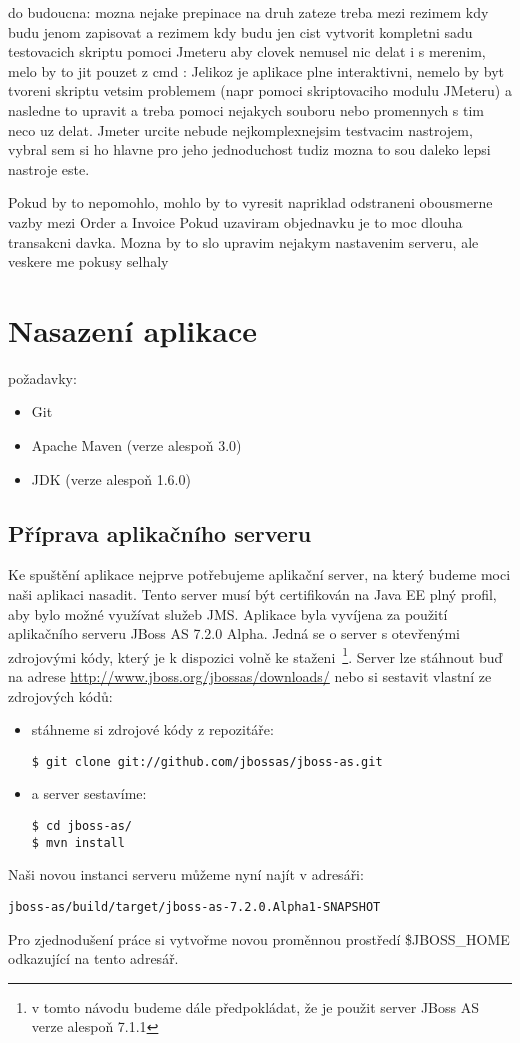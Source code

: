 \documentclass[122pt,oneside]{fithesis}
\begin{document}
do budoucna:
mozna nejake prepinace na druh zateze treba mezi rezimem kdy budu jenom zapisovat a rezimem kdy budu jen cist
vytvorit kompletni sadu testovacich skriptu pomoci Jmeteru aby clovek nemusel nic delat i s merenim, melo by to jit pouzet z cmd : Jelikoz je aplikace plne interaktivni, nemelo by byt tvoreni skriptu vetsim problemem (napr pomoci skriptovaciho modulu JMeteru) a nasledne to upravit a treba pomoci nejakych souboru nebo promennych s tim neco uz delat. Jmeter urcite nebude nejkomplexnejsim testvacim nastrojem, vybral sem si ho hlavne pro jeho jednoduchost tudiz mozna to sou daleko lepsi nastroje este.

Pokud by to nepomohlo, mohlo by to vyresit napriklad odstraneni obousmerne vazby mezi Order a Invoice 
Pokud uzaviram objednavku je to moc dlouha transakcni davka. Mozna by to slo upravim nejakym nastavenim serveru, ale veskere me pokusy selhaly

\appendix

\chapter{Nasazení aplikace} 
požadavky:
\begin{itemize}
  \item Git
  \item Apache Maven (verze alespoň 3.0)
  \item JDK (verze alespoň 1.6.0)
\end{itemize}
\section{Příprava aplikačního serveru}
Ke spuštění aplikace nejprve potřebujeme aplikační server, na který budeme moci naši aplikaci nasadit. Tento server musí být certifikován na Java EE plný profil, aby bylo možné využívat služeb JMS. Aplikace byla vyvíjena za použití aplikačního serveru JBoss AS 7.2.0 Alpha. Jedná se o server s otevřenými zdrojovými kódy, který je k dispozici volně ke staženi~\footnote{v tomto návodu budeme dále předpokládat, že je použit server JBoss AS verze alespoň 7.1.1}. Server lze stáhnout buď na adrese \href{http://www.jboss.org/jbossas/downloads/}{http://www.jboss.org/jbossas/downloads/} nebo si sestavit vlastní ze zdrojových kódů:
\begin{itemize}
  \item stáhneme si zdrojové kódy z repozitáře:
\begin{lstlisting}
$ git clone git://github.com/jbossas/jboss-as.git
\end{lstlisting}
  \item a server sestavíme:
\begin{lstlisting}
$ cd jboss-as/
$ mvn install
\end{lstlisting}
\end{itemize}
Naši novou instanci serveru můžeme nyní najít v adresáři: 
\begin{lstlisting}
jboss-as/build/target/jboss-as-7.2.0.Alpha1-SNAPSHOT
\end{lstlisting}
Pro zjednodušení práce si vytvořme novou proměnnou prostředí \$JBOSS\_HOME odkazující na tento adresář.
\end{document}
